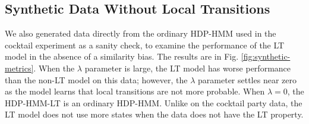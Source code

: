 \subsection{Synthetic Data Without Local Transitions}
\label{sec:synth-data-without}

We also generated data directly from the ordinary HDP-HMM used in the
cocktail experiment as a sanity check, to examine
the performance of the LT model in the absence of a similarity bias.
The results are in
Fig. \ref{fig:synthetic-metrics}.  When the $\lambda$ parameter is
large, the LT model has worse
performance than the non-LT model on this data;
however, the $\lambda$ parameter settles near zero as the 
model learns that local transitions are not more
probable.  When $\lambda = 0$, the HDP-HMM-LT is an ordinary HDP-HMM.
Unlike on the cocktail party data, the LT model does not use more
states when the data does not have the LT property.

